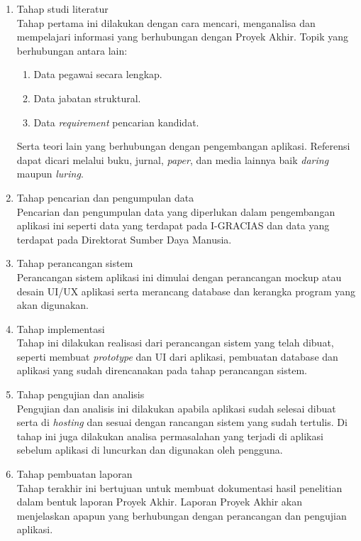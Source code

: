 \begin{enumerate}
	\item Tahap studi literatur \\
	Tahap pertama ini dilakukan dengan cara mencari, menganalisa dan mempelajari informasi yang berhubungan dengan Proyek Akhir. Topik yang berhubungan antara lain: 
	\begin{enumerate}
	\item Data pegawai secara lengkap.
	\item Data jabatan struktural.
	\item Data \textit{requirement} pencarian kandidat. 
	\end{enumerate}
	Serta teori lain yang berhubungan dengan pengembangan aplikasi. Referensi dapat dicari melalui buku, jurnal, \textit{paper}, dan media lainnya baik \textit{daring} maupun \textit{luring}.
	\item	Tahap pencarian dan pengumpulan data \\
	Pencarian dan pengumpulan data yang diperlukan dalam pengembangan aplikasi ini seperti data yang terdapat pada I-GRACIAS dan data yang terdapat pada Direktorat Sumber Daya Manusia.
	\\
	\item	Tahap perancangan sistem \\
	Perancangan sistem aplikasi ini dimulai dengan perancangan mockup atau desain UI/UX aplikasi serta merancang database dan kerangka program yang akan digunakan.
	\item Tahap implementasi \\
	Tahap ini dilakukan realisasi dari perancangan sistem yang telah dibuat, seperti membuat \textit{prototype} dan UI dari aplikasi, pembuatan database dan aplikasi yang sudah direncanakan pada tahap perancangan sistem.
	\item Tahap pengujian dan analisis \\
	Pengujian dan analisis ini dilakukan apabila aplikasi sudah selesai dibuat serta di \textit{hosting} dan sesuai dengan rancangan sistem yang sudah tertulis. Di tahap ini juga dilakukan analisa permasalahan yang terjadi di aplikasi sebelum aplikasi di luncurkan dan digunakan oleh pengguna.
	\item	Tahap pembuatan laporan \\
	Tahap terakhir ini bertujuan untuk membuat dokumentasi hasil penelitian dalam bentuk laporan Proyek Akhir. Laporan Proyek Akhir akan menjelaskan apapun yang berhubungan dengan perancangan dan pengujian aplikasi.  
	
\end{enumerate}


